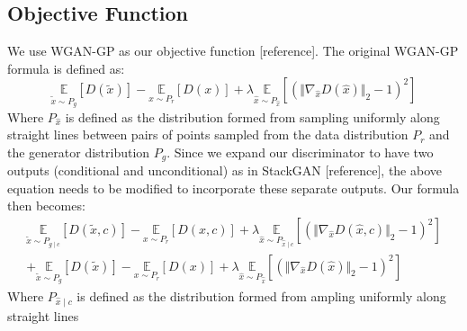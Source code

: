 \subsection{Objective Function}
We use WGAN-GP as our objective function [reference]. The original WGAN-GP formula is defined as:
\begin{equation}
\underset{\tilde{x} \sim P_g}{\mathbb{E}}[D(\tilde{x})] - \underset{x \sim P_r}{\mathbb{E}}[D(x)] + \lambda \underset{\hat{x} \sim P_\hat{x}}{\mathbb{E}}[(\Vert \nabla_\hat{x} D(\hat{x}) \Vert_2 - 1)^2]
\end{equation}
Where $P_\hat{x}$ is defined as the distribution formed from sampling uniformly along straight lines between pairs of points sampled from the data distribution $P_r$ and the generator distribution $P_g$. Since we expand our discriminator to have two outputs (conditional and unconditional) as in StackGAN [reference], the above equation needs to be modified to incorporate these separate outputs. Our formula then becomes:
\begin{equation}
\begin{align*}
\underset{\tilde{x} \sim P_{g \mid c}}{\mathbb{E}}[D(\tilde{x}, c)] - \underset{x \sim P_r}{\mathbb{E}}[D(x, c)] + \lambda \underset{\hat{x} \sim P_{\hat{x} \mid c}}{\mathbb{E}}[(\Vert \nabla_\hat{x} D(\hat{x}, c) \Vert_2 - 1)^2] \\
+ \underset{\tilde{x} \sim P_g}{\mathbb{E}}[D(\tilde{x})] - \underset{x \sim P_r}{\mathbb{E}}[D(x)] + \lambda \underset{\hat{x} \sim P_\hat{x}}{\mathbb{E}}[(\Vert \nabla_\hat{x} D(\hat{x}) \Vert_2 - 1)^2]
\end{align*}
\end{equation}
Where $P_{\hat{x} \mid c}$ is defined as the distribution formed from ampling uniformly along straight lines 